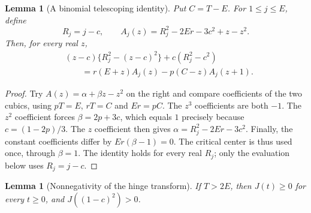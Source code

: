 \documentclass[11pt]{article}
\newtheorem{lemma}[theorem]{Lemma}
\theoremstyle{remark}
\begin{document}
\begin{lemma}[A binomial telescoping identity]\label{lem:binomial-stein-polynomial}
Put $C=T-E$. For $1\leq j\leq E$, define
\[
 R_j=j-c,\qquad A_j(z)=R_j^2-2Er-3c^2+z-z^2.
\]
Then, for every real $z$,
\begin{equation}\label{eq:binomial-cubic-stein-polynomial}
 \begin{split}
 &(z-c)\{R_j^2-(z-c)^2\}+c(R_j^2-c^2)\\
 &\hspace{2em}=r(E+z)A_j(z)-p(C-z)A_j(z+1).
 \end{split}
\end{equation}
\end{lemma}

\begin{proof}
Try $A(z)=\alpha+\beta z-z^2$ on the right and compare coefficients of the
two cubics, using $pT=E$, $rT=C$ and $Er=pC$. The $z^3$ coefficients are
both $-1$. The $z^2$ coefficient forces $\beta=2p+3c$, which equals $1$
precisely because $c=(1-2p)/3$. The $z$ coefficient then gives
$\alpha=R_j^2-2Er-3c^2$. Finally, the constant coefficients differ by
$Er(\beta-1)=0$. The critical center is thus used once, through $\beta=1$.
The identity holds for every real $R_j$; only the evaluation below uses
$R_j=j-c$.
\end{proof}

\begin{lemma}[Nonnegativity of the hinge transform]
\label{lem:binomial-double-cumulative}
If $T>2E$, then $J(t)\geq0$ for every $t\geq0$, and
$J((1-c)^2)>0$.
\end{lemma}
\end{document}
